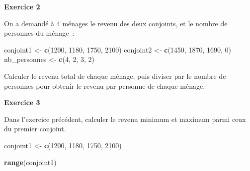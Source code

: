 \documentclass[12pt,]{book}
\newenvironment{Shaded}{\begin{snugshade}}{\end{snugshade}}
\newcommand{\DecValTok}[1]{\textcolor[rgb]{0.06,0.06,0.06}{#1}}
\newcommand{\KeywordTok}[1]{\textcolor[rgb]{0.27,0.27,0.27}{\textbf{#1}}}
\newcommand{\NormalTok}[1]{#1}
\newcommand{\OperatorTok}[1]{\textcolor[rgb]{0.43,0.43,0.43}{\textbf{#1}}}
\newcommand{\StringTok}[1]{\textcolor[rgb]{0.5,0.5,0.5}{#1}}
\begin{document}
\fi

\textbf{Exercice 2}

On a demandé à 4 ménages le revenu des deux conjoints, et le nombre de personnes du ménage~:

\begin{Shaded}
\begin{Highlighting}[]
\NormalTok{conjoint1 <-}\StringTok{ }\KeywordTok{c}\NormalTok{(}\DecValTok{1200}\NormalTok{, }\DecValTok{1180}\NormalTok{, }\DecValTok{1750}\NormalTok{, }\DecValTok{2100}\NormalTok{)}
\NormalTok{conjoint2 <-}\StringTok{ }\KeywordTok{c}\NormalTok{(}\DecValTok{1450}\NormalTok{, }\DecValTok{1870}\NormalTok{, }\DecValTok{1690}\NormalTok{, }\DecValTok{0}\NormalTok{)}
\NormalTok{nb_personnes <-}\StringTok{ }\KeywordTok{c}\NormalTok{(}\DecValTok{4}\NormalTok{, }\DecValTok{2}\NormalTok{, }\DecValTok{3}\NormalTok{, }\DecValTok{2}\NormalTok{)}
\end{Highlighting}
\end{Shaded}

Calculer le revenu total de chaque ménage, puis diviser par le nombre de personnes pour obtenir le revenu par personne de chaque ménage.

\textbf{Exercice 3}

Dans l'exercice précédent, calculer le revenu minimum et maximum parmi ceux du premier conjoint.

\begin{Shaded}
\begin{Highlighting}[]
\NormalTok{conjoint1 <-}\StringTok{ }\KeywordTok{c}\NormalTok{(}\DecValTok{1200}\NormalTok{, }\DecValTok{1180}\NormalTok{, }\DecValTok{1750}\NormalTok{, }\DecValTok{2100}\NormalTok{)}
\end{Highlighting}
\end{Shaded}

\iffalse

\begin{Shaded}
\begin{Highlighting}[]
\KeywordTok{range}\NormalTok{(conjoint1)}
\end{Highlighting}
\end{Shaded}
\end{document}
